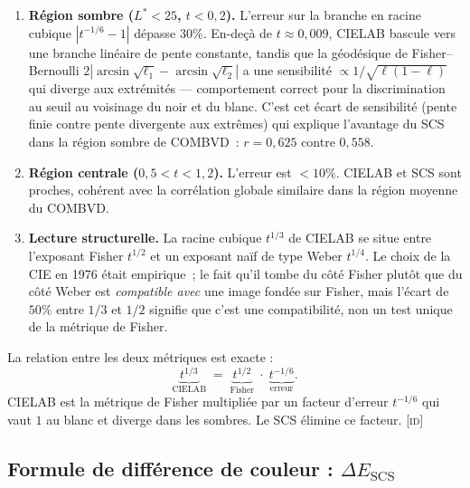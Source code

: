 \documentclass[12pt,a4paper]{article}
\begin{document}
\begin{enumerate}[nosep]
\item \textbf{R\'egion sombre ($L^* < 25$, $t < 0{,}2$).} L'erreur
  sur la branche en racine cubique $|t^{-1/6} - 1|$ d\'epasse $30\%$.
  En-de\c{c}\`a de $t \approx 0{,}009$, CIELAB bascule vers une
  branche lin\'eaire de pente constante, tandis que la g\'eod\'esique
  de Fisher--Bernoulli
  $2|\arcsin\sqrt{\ell_1} - \arcsin\sqrt{\ell_2}|$ a une sensibilit\'e
  $\propto 1/\sqrt{\ell(1-\ell)}$ qui diverge aux extr\'emit\'es ---
  comportement correct pour la discrimination au seuil au voisinage du
  noir et du blanc. C'est cet \'ecart de sensibilit\'e (pente finie
  contre pente divergente aux extr\^emes) qui explique l'avantage du
  SCS dans la r\'egion sombre de COMBVD~: $r = 0{,}625$ contre
  $0{,}558$.

\item \textbf{R\'egion centrale ($0{,}5 < t < 1{,}2$).} L'erreur est
  $< 10\%$. CIELAB et SCS sont proches, coh\'erent avec la
  corr\'elation globale similaire dans la r\'egion moyenne du COMBVD.

\item \textbf{Lecture structurelle.} La racine cubique $t^{1/3}$ de
  CIELAB se situe entre l'exposant Fisher $t^{1/2}$ et un exposant
  na\"if de type Weber $t^{1/4}$. Le choix de la CIE en 1976 \'etait
  empirique~; le fait qu'il tombe du c\^ot\'e Fisher plut\^ot que du
  c\^ot\'e Weber est \emph{compatible avec} une image fond\'ee sur
  Fisher, mais l'\'ecart de $50\%$ entre $1/3$ et $1/2$ signifie que
  c'est une compatibilit\'e, non un test unique de la m\'etrique de
  Fisher.
\end{enumerate}

\begin{identitybox}
La relation entre les deux m\'etriques est exacte :
\[
  \underbrace{t^{1/3}}_{\text{CIELAB}} \;=\;
  \underbrace{t^{1/2}}_{\text{Fisher}} \;\cdot\;
  \underbrace{t^{-1/6}}_{\text{erreur}}.
\]
CIELAB est la m\'etrique de Fisher multipli\'ee par un facteur
d'erreur $t^{-1/6}$ qui vaut $1$ au blanc et diverge dans les
sombres. Le SCS \'elimine ce facteur. \textsc{[id]}
\end{identitybox}

\subsection{Formule de diff\'erence de couleur : $\Delta E_{\mathrm{SCS}}$}
\end{document}
